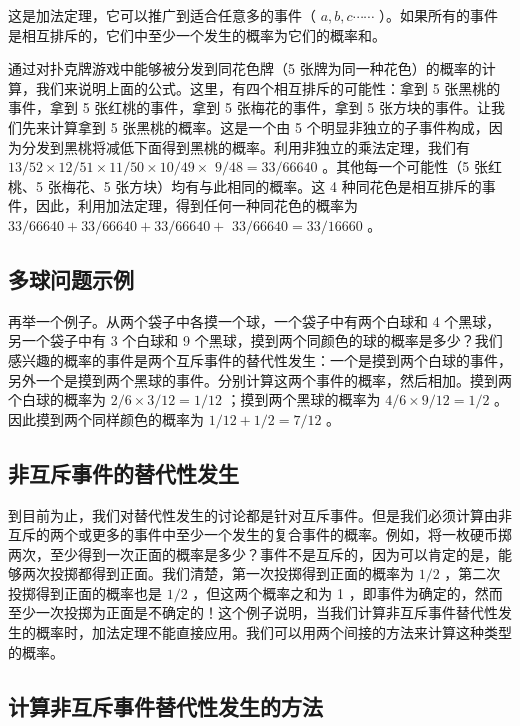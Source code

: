 这是加法定理，它可以推广到适合任意多的事件（ $a, b, c \cdots \cdots$ ）。如果所有的事件是相互排斥的，它们中至少一个发生的概率为它们的概率和。

通过对扑克牌游戏中能够被分发到同花色牌（5 张牌为同一种花色）的概率的计算，我们来说明上面的公式。这里，有四个相互排斥的可能性：拿到 5 张黑桃的事件，拿到 5 张红桃的事件，拿到 5 张梅花的事件，拿到 5 张方块的事件。让我们先来计算拿到 5 张黑桃的概率。这是一个由 5 个明显非独立的子事件构成，因为分发到黑桃将减低下面得到黑桃的概率。利用非独立的乘法定理，我们有 $13 / 52 \times 12 / 51 \times 11 / 50 \times 10 / 49 \times$ $9 / 48=33 / 66640$ 。其他每一个可能性（5 张红桃、5 张梅花、5 张方块）均有与此相同的概率。这 4 种同花色是相互排斥的事件，因此，利用加法定理，得到任何一种同花色的概率为 $33 / 66640+33 / 66640+33 / 66640+$ $33 / 66640=33 / 16660$ 。

\subsection{多球问题示例}

再举一个例子。从两个袋子中各摸一个球，一个袋子中有两个白球和 4 个黑球，另一个袋子中有 3 个白球和 9 个黑球，摸到两个同颜色的球的概率是多少？我们感兴趣的概率的事件是两个互斥事件的替代性发生：一个是摸到两个白球的事件，另外一个是摸到两个黑球的事件。分别计算这两个事件的概率，然后相加。摸到两个白球的概率为 $2 / 6 \times 3 / 12=1 / 12$ ；摸到两个黑球的概率为 $4 / 6 \times 9 / 12=1 / 2$ 。因此摸到两个同样颜色的概率为 $1 / 12+1 / 2=7 / 12$ 。

\subsection{非互斥事件的替代性发生}

到目前为止，我们对替代性发生的讨论都是针对互斥事件。但是我们必须计算由非互斥的两个或更多的事件中至少一个发生的复合事件的概率。例如，将一枚硬币掷两次，至少得到一次正面的概率是多少？事件不是互斥的，因为可以肯定的是，能够两次投掷都得到正面。我们清楚，第一次投掷得到正面的概率为 $1 / 2$ ，第二次投掷得到正面的概率也是 $1 / 2$ ，但这两个概率之和为 1 ，即事件为确定的，然而至少一次投掷为正面是不确定的！这个例子说明，当我们计算非互斥事件替代性发生的概率时，加法定理不能直接应用。我们可以用两个间接的方法来计算这种类型的概率。

\subsection{计算非互斥事件替代性发生的方法}

